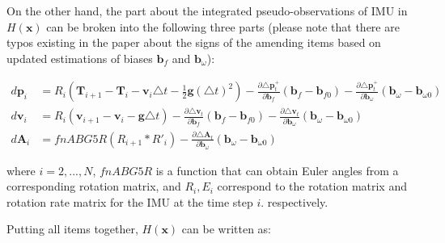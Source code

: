 \documentclass[12pt]{article}   %
\begin{document}

On the other hand, the part about the integrated pseudo-observations of IMU in $H(\textbf{x})$ can be broken into the following three parts (please note that there are typos existing in the paper \cite{Lupton2012} about the signs of the amending items based on updated estimations of biases $\textbf{b}_f$ and $\textbf{b}_\omega$):

\begin{align}
d\textbf{p}_i &= R_i (\textbf{T}_{i+1} - \textbf{T}_i - \textbf{v}_i \triangle t - \frac{1}{2} \textbf{g} {(\triangle t)}^2) - \frac{\partial \triangle \textbf{p}^+_t}{\partial \textbf{b}_f} (\textbf{b}_f - \textbf{b}_{f0}) -  \frac{\partial \triangle \textbf{p}^+_t}{\partial \textbf{b}_\omega} (\textbf{b}_\omega - \textbf{b}_{\omega0})\\
d\textbf{v}_i &= R_i (\textbf{v}_{i+1} - \textbf{v}_i - \textbf{g} \triangle t) - \frac{\partial \triangle \textbf{v}_t}{\partial \textbf{b}_f} (\textbf{b}_f - \textbf{b}_{f0}) -  \frac{\partial \triangle \textbf{v}_t}{\partial \textbf{b}_\omega} (\textbf{b}_\omega - \textbf{b}_{\omega0})\\
d\textbf{A}_i &= fnABG5R(R_{i+1}*R'_{i}) - \frac{\partial \triangle \textbf{A}_t}{\partial \textbf{b}_\omega} (\textbf{b}_\omega - \textbf{b}_{\omega0})
\end{align}

where $i = 2,..., N$, $fnABG5R$ is a function that can obtain Euler angles from a corresponding rotation matrix, and $R_i, E_i$ correspond to the rotation matrix and rotation rate matrix for the IMU at the time step $i$. respectively.

Putting all items together, $H(\textbf{x})$ can be written as:
\end{document}
